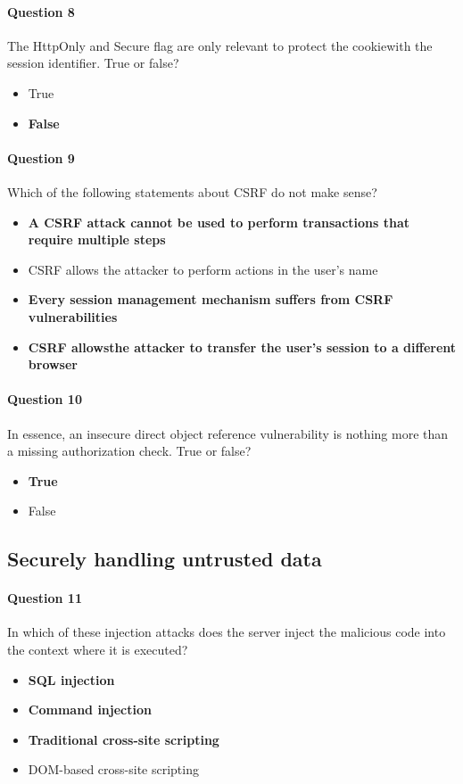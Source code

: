 \documentclass[titlepage]{article}
\begin{document}
    \paragraph{Question 8} The HttpOnly and Secure flag are only relevant to protect the cookiewith the session identifier. True or false?
    \begin{itemize}
        \item True
        \item \textbf{False} \checkmark
    \end{itemize}
    \paragraph{Question 9} Which of the following statements about CSRF do not make sense?
    \begin{itemize}
        \item \textbf{A CSRF attack cannot be used to perform transactions that require multiple steps} \checkmark
        \item CSRF allows the attacker to perform actions in the user's name
        \item \textbf{Every session management mechanism suffers from CSRF vulnerabilities} \checkmark
        \item \textbf{CSRF allowsthe attacker to transfer the user's session to a different browser} \checkmark
    \end{itemize}
    \paragraph{Question 10} In essence, an insecure direct object reference vulnerability is nothing more than a missing authorization check. True or false?
    \begin{itemize}
        \item \textbf{True} \checkmark
        \item False
    \end{itemize}
    \subsection{Securely handling untrusted data}
    \paragraph{Question 11} In which of these injection attacks does the server inject the malicious code into the context where it is executed?
    \begin{itemize}
        \item \textbf{SQL injection} \checkmark
        \item \textbf{Command injection} \checkmark
        \item \textbf{Traditional cross-site scripting} \checkmark
        \item DOM-based cross-site scripting
    \end{itemize}
\end{document}
